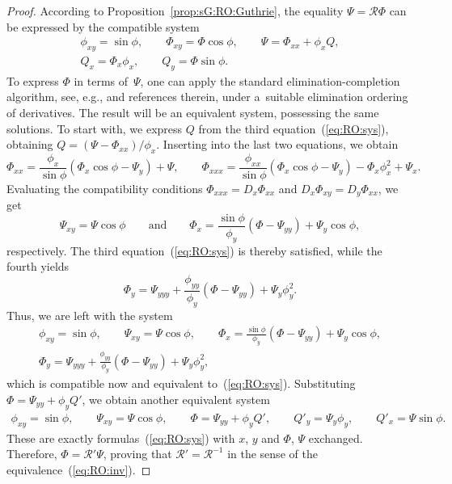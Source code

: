 \documentclass[pdftex]{sigma}
\def\eqref#1{{\rm(\ref{#1})}}
\def\RO{{\mathcal R}}
\numberwithin{equation}{section}
\theoremstyle{definition}
\begin{document}
\begin{proof}
According to Proposition~\ref{prop:sG:RO:Guthrie},
the equality $\Psi = \RO\Phi$ can be expressed by the compatible system
\begin{gather}
\phi_{xy} = \sin\phi,
\qquad
\Phi_{xy} = \Phi \cos\phi,
\qquad
\Psi = \Phi_{xx} + \phi_x Q,
\nonumber\\
Q_x = \Phi_x \phi_x,\qquad
Q_y = \Phi \sin \phi.\label{eq:RO:sys}
\end{gather}
To express $\Phi$ in terms of~$\Psi$,
one can apply the standard elimination-completion algorithm,
see, e.g., \cite{R-L-W-2001} and references therein,
under a~suitable elimination ordering of derivatives.
The result will be an equivalent system, possessing the same solutions.
%
To start with, we express $Q$ from the third equation~\eqref{eq:RO:sys},
obtaining $Q = (\Psi - \Phi_{xx})/\phi_x$.
Inserting into the last two equations, we obtain
\[
\Phi_{xx} = \frac{\phi_x}{\sin\phi} (\Phi_x \cos\phi - \Psi_y) + \Psi,
\qquad
\Phi_{xxx} = \frac{\phi_{xx}}{\sin\phi} (\Phi_x \cos\phi - \Psi_y)
 - \Phi_x \phi_x^2 + \Psi_x.
\]
Evaluating the compatibility conditions
$\Phi_{xxx} = D_x \Phi_{xx}$ and
$D_x \Phi_{xy} = D_y \Phi_{xx}$, we get
\[
\Psi_{xy} = \Psi \cos\phi
 \qquad \text{and} \qquad \Phi_x = \frac{\sin\phi}{\phi_y} (\Phi - \Psi_{yy}) + \Psi_y \cos\phi,
\]
respectively.
The third equation~\eqref{eq:RO:sys} is thereby satisfied,
while the fourth yields
\[
\Phi_y = \Psi_{yyy} + \frac{\phi_{yy}}{\phi_y} (\Phi - \Psi_{yy})
 + \Psi_y \phi_y^2.
\]
Thus, we are left with the system
\begin{gather*}
\phi_{xy} = \sin\phi,
\qquad
\Psi_{xy} = \Psi \cos\phi,
\qquad
\Phi_x = \frac{\sin\phi}{\phi_y} (\Phi - \Psi_{yy}) + \Psi_y \cos\phi,
\\
\Phi_y = \Psi_{yyy} + \frac{\phi_{yy}}{\phi_y} (\Phi - \Psi_{yy})
 + \Psi_y \phi_y^2,
\end{gather*}
which is compatible now and equivalent to~\eqref{eq:RO:sys}.
Substituting $\Phi = \Psi_{yy} + \phi_y Q'$, we obtain another equivalent
system
\begin{gather*}
\phi_{xy} = \sin\phi,
\qquad
\Psi_{xy} = \Psi \cos\phi,
\qquad
\Phi = \Psi_{yy} + \phi_y Q',
\qquad
Q'_y = \Psi_y \phi_y,
\qquad
Q'_{x} = \Psi \sin\phi.
\end{gather*}
These are exactly formulas~\eqref{eq:RO:sys}
with $x$, $y$ and $\Phi$, $\Psi$ exchanged.
Therefore, $\Phi = \RO'\Psi$, proving that $\RO' = \RO^{-1}$ in the sense
of the equivalence~\eqref{eq:RO:inv}.
\end{proof}
\end{document}

